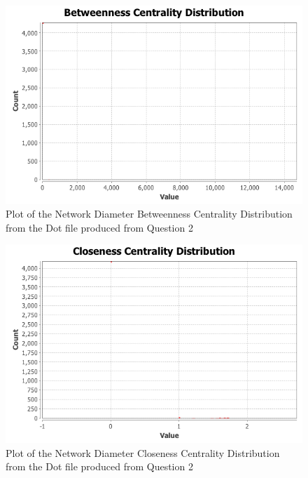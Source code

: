 \documentclass[letterpaper,11pt]{article}
\begin{document}
\begin{figure}[p]
\includegraphics[scale=0.5]{"q3/Network-Diameter/Betweenness Centrality Distribution"}
\caption{Plot of the Network Diameter Betweenness Centrality Distribution from the Dot file produced from Question 2}
\label{fig:q3netdiam-betweenness}
\end{figure}

\begin{figure}[p]
\includegraphics[scale=0.5]{"q3/Network-Diameter/Closeness Centrality Distribution"}
\caption{Plot of the Network Diameter Closeness Centrality Distribution from the Dot file produced from Question 2}
\label{fig:q3netdiam-closeness}
\end{figure}
\end{document}
